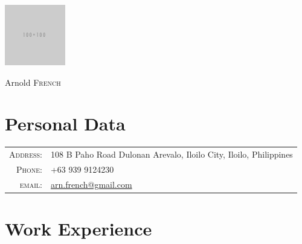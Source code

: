 \documentclass[a4paper,10pt]{article}
\begin{document}
\pagestyle{empty}


\begin{minipage}{0.3\textwidth}
  \includegraphics[scale=0.75]{image}
\end{minipage}
\hfill
\begin{minipage}{0.6\textwidth}
  \raggedleft \Huge Arnold \textsc{French}
\end{minipage}


\section{Personal Data}

\begin{tabular}{rl}
  \textsc{Address:} & 108 B Paho Road Dulonan Arevalo, Iloilo City, Iloilo, Philippines\\
  \textsc{Phone:}   & +63 939 9124230\\
  \textsc{email:}   & \href{mailto:arn.french@gmail.com}{arn.french@gmail.com}
\end{tabular}

\section{Work Experience}
\end{document}
